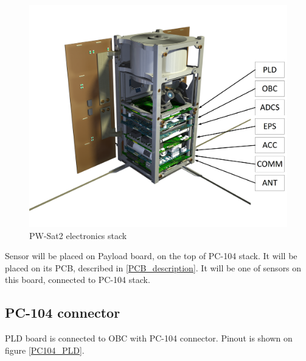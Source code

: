         \begin{figure}[H]
            \centering
            \includegraphics[width=0.7\paperwidth]{img/PW-Sat2-stack.png}
            \caption{PW-Sat2 electronics stack}
            \label{PW-Sat2_stack}
        \end{figure}


        Sensor will be placed on Payload board, on the top of PC-104 stack. It will be placed on its PCB, described in \ref{PCB_description}. It will be one of sensors on this board, connected to PC-104 stack.


    \subsection{PC-104 connector}
        PLD board is connected to OBC with PC-104 connector. Pinout is shown on figure \ref{PC104_PLD}.


